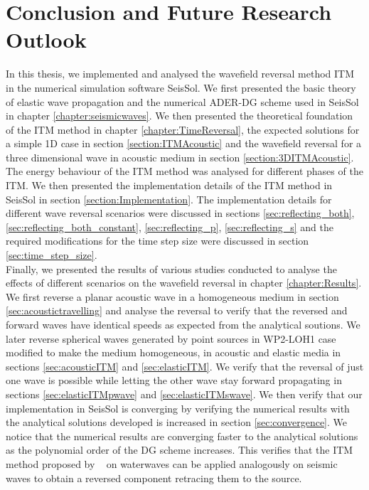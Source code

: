 \chapter{Conclusion and Future Research Outlook}\label{chapter:Conclusion}
In this thesis, we implemented and analysed the wavefield reversal method \ac{ITM} in the numerical simulation software SeisSol. We first presented the basic theory of elastic wave propagation and the numerical \ac{ADER}-\ac{DG} scheme used in SeisSol in chapter \ref{chapter:seismicwaves}.
We then presented the theoretical foundation of the \ac{ITM} method in chapter \ref{chapter:TimeReversal}, the expected solutions for a simple 1D case in section \ref{section:ITMAcoustic} and the wavefield reversal for a three dimensional wave in acoustic medium in section \ref{section:3DITMAcoustic}.
The energy behaviour of the \ac{ITM} method was analysed for different phases of the \ac{ITM}.
We then presented the implementation details of the \ac{ITM} method in SeisSol in section \ref{section:Implementation}. The implementation details 
for different wave reversal scenarios were discussed in sections \ref{sec:reflecting_both}, \ref{sec:reflecting_both_constant}, \ref{sec:reflecting_p}, \ref{sec:reflecting_s} and the required modifications for the time step size were discussed in section \ref{sec:time_step_size}. \\

Finally, we presented the results of various studies conducted to analyse the effects of different scenarios on the wavefield reversal in chapter \ref{chapter:Results}.
We first reverse a planar acoustic wave in a homogeneous medium in section \ref{sec:acoustictravelling} and analyse the reversal to verify that the reversed and forward waves have identical speeds as expected from the analytical soutions.
We later reverse spherical waves generated by point sources in WP2-LOH1 case modified to make the medium homogeneous, in acoustic and elastic media in sections \ref{sec:acousticITM} and \ref{sec:elasticITM}. We verify that the reversal of just one wave is possible while letting 
the other wave stay forward propagating in sections \ref{sec:elasticITMpwave} and \ref{sec:elasticITMswave}. We then verify that our implementation in SeisSol is converging by verifying the numerical results with the analytical solutions developed is increased in section \ref{sec:convergence}. We notice that
the numerical results are converging faster to the analytical solutions as the polynomial order of the \ac{DG} scheme increases. This verifies that the \ac{ITM}
method proposed by ~\parencite{Bacot2016} on waterwaves can be applied analogously on seismic waves to obtain a reversed component retracing them to the source. \\

